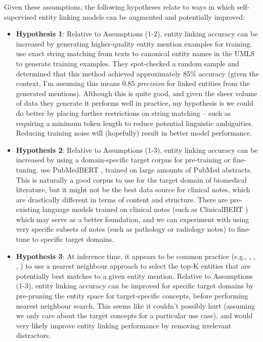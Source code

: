 \documentclass{article}
\begin{document}
Given these assumptions, the following hypotheses relate to ways in which self-supervised entity linking models can be augmented and potentially improved:

\begin{itemize}
  \item \textbf{Hypothesis 1}: Relative to Assumptions (1-2), entity linking accuracy can be increased by generating higher-quality entity mention examples for training. \cite{zhang_knowledge-rich_2022} use exact string matching from texts to canonical entity names in the UMLS to generate training examples. They spot-checked a random sample and determined that this method achieved approximately 85\% accuracy (given the context, I'm assuming this means 0.85 \emph{precision} for linked entities from the generated mentions). Although this is quite good, and given the sheer volume of data they generate it performs well in practice, my hypothesis is we could do better by placing further restrictions on string matching -- such as requiring a minimum token length to reduce potential linguistic ambiguities. Reducing training noise will (hopefully) result in better model performance.

  \item \textbf{Hypothesis 2}: Relative to Assumptions (1-3), entity linking accuracy can be increased by using a domain-specific target corpus for pre-training or fine-tuning. \cite{zhang_knowledge-rich_2022} use PubMedBERT \cite{gu_domain-specific_2022}, trained on large amounts of PubMed abstracts. This is naturally a good corpus to use for the target domain of biomedical literature, but it might not be the best data source for clinical notes, which are drastically different in terms of content and structure. There are pre-existing language models trained on clinical notes (such as ClinicalBERT \cite{huang_clinicalbert_2020}) which may serve as a better foundation, and we can experiment with using very specific subsets of notes (such as pathology or radiology notes) to fine-tune to specific target domains.

  \item \textbf{Hypothesis 3}: At inference time, it appears to be common practice (e.g., \cite{zhang_knowledge-rich_2022}, \cite{jose_medlinker_2020}, \cite{logeswaran_zero-shot_2019}, \cite{wu_scalable_2020}) to use a nearest neighbour approach to select the top-K entities that are potentially best matches to a given entity mention. Relative to Assumptions (1-3), entity linking accuracy can be improved for specific target domains by pre-pruning the entity space for target-specific concepts, before performing nearest neighbour search. This seems like it couldn't possibly hurt (assuming we only care about the target concepts for a particular use case), and would very likely improve entity linking performance by removing irrelevant distractors.


\end{itemize}
\end{document}

